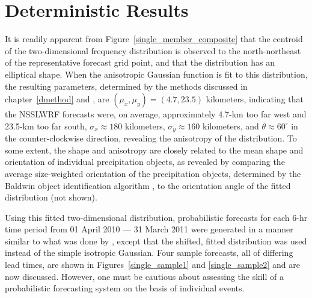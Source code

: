 

\section{Deterministic Results}
\label{dresults}

It is readily apparent from \mbox{Figure \ref{single_member_composite}} that the centroid of the two-dimensional frequency distribution is observed to the north-northeast of the representative forecast grid point, and that the distribution has an elliptical shape. When the anisotropic Gaussian function is fit to this distribution, the resulting parameters, determined by the methods discussed in \mbox{chapter \ref{dmethod}} and \cite{Lak2010}, are $(\mu_x, \mu_y) = (4.7, 23.5)$ kilometers, indicating that the NSSLWRF forecasts were, on average, approximately \mbox{4.7-km} too far west and \mbox{23.5-km} too far south, $\sigma_x \approx 180$ kilometers, $\sigma_y \approx 160$ kilometers, and $\theta \approx 60^{\circ}$ in the counter-clockwise direction, revealing the anisotropy of the distribution. To some extent, the shape and anisotropy are closely related to the mean shape and orientation of individual precipitation objects, as revealed by comparing the average size-weighted orientation of the precipitation objects, determined by the Baldwin object identification algorithm \citep{Baldwin2005}, to the orientation angle of the fitted distribution (not shown).

Using this fitted two-dimensional distribution, probabilistic forecasts for each \mbox{6-hr} time period from 01 April 2010 --- 31 March 2011 were generated in a manner similar to what was done by \cite{Sobash2011}, except that the shifted, fitted distribution was used instead of the simple isotropic Gaussian. Four sample forecasts, all of differing lead times, are shown in \mbox{Figures \ref{single_sample1}} and \ref{single_sample2} and are now discussed. However, one must be cautious about assessing the skill of a probabilistic forecasting system on the basis of individual events.

